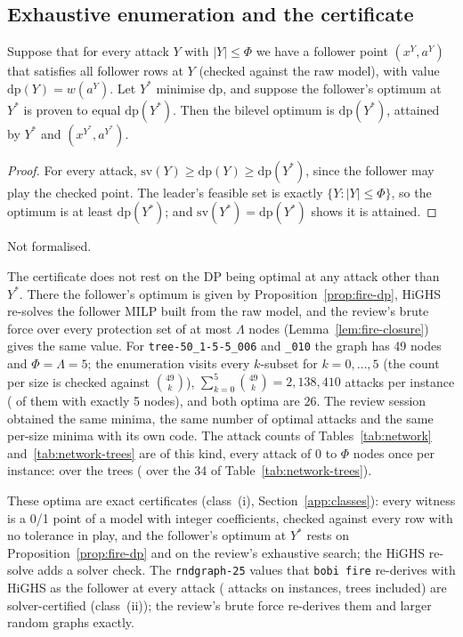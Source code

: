 \subsection{Exhaustive enumeration and the certificate}

\begin{theorem}\label{thm:fire-cert}
Suppose that for every attack $Y$ with $|Y|\le\Phi$ we have a follower point
$(x^Y,a^Y)$ that satisfies all follower rows at $Y$ (checked against the raw
model), with value $\mathrm{dp}(Y)=w(a^Y)$. Let $Y^{*}$ minimise $\mathrm{dp}$, and
suppose the follower's optimum at $Y^{*}$ is proven to equal $\mathrm{dp}(Y^{*})$.
Then the bilevel optimum is $\mathrm{dp}(Y^{*})$, attained by $Y^{*}$ and
$(x^{Y^{*}},a^{Y^{*}})$.
\end{theorem}
\begin{proof}
For every attack, $\mathrm{sv}(Y)\ge\mathrm{dp}(Y)\ge\mathrm{dp}(Y^{*})$, since the
follower may play the checked point. The leader's feasible set is exactly
$\{Y:|Y|\le\Phi\}$, so the optimum is at least $\mathrm{dp}(Y^{*})$; and
$\mathrm{sv}(Y^{*})=\mathrm{dp}(Y^{*})$ shows it is attained.
\end{proof}
\noindent Not formalised.

The certificate does not rest on the DP being optimal at any attack other
than $Y^{*}$. There the follower's optimum is given by
Proposition~\ref{prop:fire-dp}, HiGHS re-solves the follower MILP built from the raw
model, and the review's brute force over every protection set of at most
$\Lambda$ nodes (Lemma~\ref{lem:fire-closure}) gives the same value. For
\texttt{tree-50\_1-5-5\_006} and \texttt{\_010} the graph has 49
nodes and $\Phi=\Lambda=5$; the enumeration visits every $k$-subset for
$k=0,\dots,5$ (the count per size is checked against $\binom{49}k$),
$\sum_{k=0}^5\binom{49}k=2{,}138{,}410$ attacks per instance
(\SuppNetFullBudgetAttacks{} of them with exactly 5 nodes), and both optima are
$26$. The review session obtained the same minima, the same number of optimal
attacks and the same per-size minima with its own code. The attack counts of
Tables~\ref{tab:network} and~\ref{tab:network-trees} are of this kind, every
attack of $0$ to $\Phi$ nodes once per instance: \SuppNetTreeAttacks{} over the
\SuppNetTrees{} trees (\SuppNetTableTreeAttacks{} over the 34 of
Table~\ref{tab:network-trees}).

These optima are exact certificates (class~(i), Section~\ref{app:classes}):
every witness is a 0/1 point of a model with integer coefficients, checked
against every row with no tolerance in play, and the follower's optimum at
$Y^{*}$ rests on Proposition~\ref{prop:fire-dp} and on the review's exhaustive
search; the HiGHS re-solve adds a solver check. The \NetworkRndSmall{}
\texttt{rndgraph-25} values that \texttt{bobi fire} re-derives with HiGHS as the
follower at every attack (\SuppNetHighsAttacks{} attacks on
\SuppNetHighsInstances{} instances, trees included) are solver-certified
(class~(ii)); the review's brute force re-derives them and \NetworkReviewOnly{} larger random
graphs exactly.
